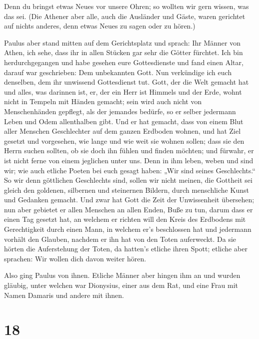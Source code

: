 Denn du bringst etwas Neues vor unsere Ohren; so wollten
wir gern wissen, was das sei.  (Die Athener aber alle,
auch die Ausländer und Gäste, waren gerichtet auf nichts anderes, denn
etwas Neues zu sagen oder zu hören.)

 Paulus aber stand mitten auf dem Gerichtsplatz und
sprach: Ihr Männer von Athen, ich sehe, dass ihr in allen Stücken gar
sehr die Götter fürchtet.  Ich bin herdurchgegangen und
habe gesehen eure Gottesdienste und fand einen Altar, darauf war
geschrieben: Dem unbekannten Gott. Nun verkündige ich euch denselben,
dem ihr unwissend Gottesdienst tut.  Gott, der die Welt
gemacht hat und alles, was darinnen ist, er, der ein Herr ist Himmels
und der Erde, wohnt nicht in Tempeln mit Händen gemacht; 
sein wird auch nicht von Menschenhänden gepflegt, als der jemandes
bedürfe, so er selber jedermann Leben und Odem allenthalben gibt.
 Und er hat gemacht, dass von einem Blut aller Menschen
Geschlechter auf dem ganzen Erdboden wohnen, und hat Ziel gesetzt und
vorgesehen, wie lange und wie weit sie wohnen sollen; 
dass sie den Herrn suchen sollten, ob sie doch ihn fühlen und finden
möchten; und fürwahr, er ist nicht ferne von einem jeglichen unter uns.
 Denn in ihm leben, weben und sind wir; wie auch etliche
Poeten bei euch gesagt haben: „Wir sind seines Geschlechts.``
 So wir denn göttlichen Geschlechts sind, sollen wir
nicht meinen, die Gottheit sei gleich den goldenen, silbernen und
steinernen Bildern, durch menschliche Kunst und Gedanken gemacht.
 Und zwar hat Gott die Zeit der Unwissenheit übersehen;
nun aber gebietet er allen Menschen an allen Enden, Buße zu tun,
 darum dass er einen Tag gesetzt hat, an welchem er
richten will den Kreis des Erdbodens mit Gerechtigkeit durch einen Mann,
in welchem er's beschlossen hat und jedermann vorhält den Glauben,
nachdem er ihn hat von den Toten auferweckt.  Da sie
hörten die Auferstehung der Toten, da hatten's etliche ihren Spott;
etliche aber sprachen: Wir wollen dich davon weiter hören.

 Also ging Paulus von ihnen.  Etliche
Männer aber hingen ihm an und wurden gläubig, unter welchen war
Dionysius, einer aus dem Rat, und eine Frau mit Namen Damaris und andere
mit ihnen.

\hypertarget{section-17}{%
\section{18}\label{section-17}}

